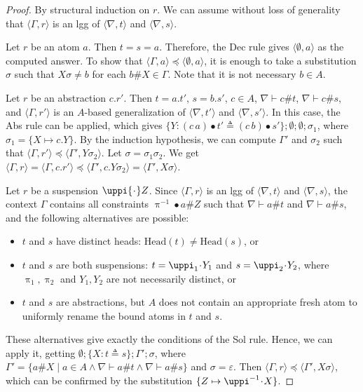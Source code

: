 \documentclass{llncs}
\newcommand{\head}{\mathrm{Head}}
\newcommand{\permap}{{\mkern 1mu\cdot \mkern 1mu}}
\newcommand{\permef}{\bullet}
\newcommand\ppi{\uppi}
\newcommand{\np}[2]{\langle #1, \allowbreak #2\rangle}
\newcommand{\Atoms}{A}
\begin{document}
\begin{proof}
 By structural induction on $r$. We can assume without loss of generality that $\np{\Gamma}{r}$ is an lgg of $\np{\nabla}{t}$ and $\np{\nabla}{s}$.

Let $r$ be an atom $a$. Then $t=s=a$. Therefore, the {\sf Dec} rule gives $\np{\emptyset}{a}$ as the computed answer. To show that $\np{\Gamma}{a}\preceq \np{\emptyset}{a}$, it is enough to take a substitution $\sigma$ such that $X\sigma \neq b$ for each $b\# X\in \Gamma$. Note that it is not necessary $b\in \Atoms$.

Let $r$ be an abstraction $c.r'$. Then $t=a.t'$, $s=b.s'$, $c\in A$, $\nabla\vdash c \# t$, $\nabla\vdash c \# s$, and $\np{\Gamma}{r'}$ is an $\Atoms$-based generalization of $\np{\nabla}{t'}$ and $\np{\nabla}{s'}$. In this case, the {\sf Abs} rule can be applied, which gives $\{Y:(c\,a)\permef t'\triangleq (c\,b)\permef s'\};\emptyset;\emptyset;\sigma_1$, where $\sigma_1=\{X\mapsto c.Y\}$. By the induction hypothesis, we can compute $\Gamma'$ and $\sigma_2$ such that $\np{\Gamma}{r'}\preceq \np{\Gamma'}{Y\sigma_2}$. Let $\sigma=\sigma_1\sigma_2$. We get $\np{\Gamma}{r}=\np{\Gamma}{c.r'} \preceq \np{\Gamma'}{c.Y\sigma_2}= \np{\Gamma'}{X\sigma}$.

Let $r$ be a suspension $\ppi\permap Z$. Since $\np{\Gamma}{r}$ is an lgg of $\np{\nabla}{t}$ and $\np{\nabla}{s}$, the context $\Gamma$ contains all constraints $\ppi^{-1}\permef a\# Z$ such that $\nabla\vdash a\# t$ and $\nabla\vdash a\# s$, and the following alternatives are possible:
\begin{itemize}
\item[(a)] $t$ and $s$ have distinct heads: ${ \head(t)}\neq { \head(s)}$, or
\item[(b)] $t$ and $s$ are both suspensions: $ t= \ppi_1 \permap Y_1$ and $ s=\ppi_2\permap Y_2$, where $\ppi_1,\ppi_2$ and $ Y_1,Y_2$ are not necessarily distinct, or
\item[(c)] $t$ and $s$ are abstractions, but $\Atoms$ does not contain an appropriate fresh atom to uniformly rename the bound atoms in $t$ and $s$.
\end{itemize}

These alternatives give exactly the conditions of the {\sf Sol} rule. Hence, we can apply it, getting $\emptyset;\{X:t\triangleq s\};\Gamma';\sigma$, where $\Gamma'=\{a\# X\mid a\in \Atoms\wedge \nabla \vdash a\# t \wedge \nabla\vdash a\# s\}$ and $\sigma=\varepsilon$. Then $\np{\Gamma}{r}\preceq \np{\Gamma'}{X\sigma}$, which can be confirmed by the substitution $\{Z\mapsto \ppi^{-1}\permap X\}$. 


\end{proof}
\end{document}
